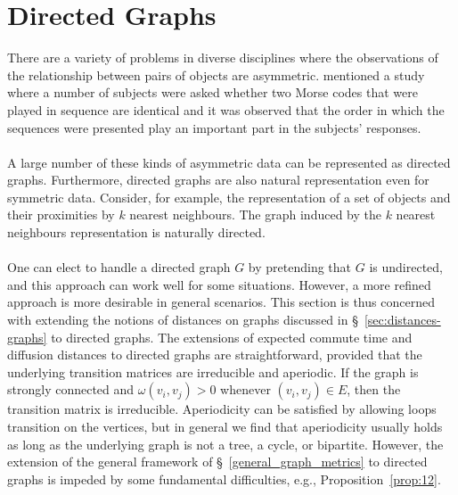 \documentclass[10pt,twocolumn]{article}
\numberwithin{equation}{section}
\begin{document}
\section{Directed Graphs}
\label{sec:dist-direct-graphs}
There are a variety of problems in diverse disciplines where the
observations of the relationship between pairs of objects are
asymmetric. \cite{rothkopf57} mentioned a study where a number of
subjects were asked whether two Morse codes that were played in
sequence are identical and it was observed that the order in which the
sequences were presented play an important part in the subjects'
responses. \\ \\
\noindent
A large number of these kinds of asymmetric data can be represented as
directed graphs. Furthermore, directed graphs are also natural
representation even for symmetric data. Consider, for example, the
representation of a set of objects and their proximities by $k$
nearest neighbours. The graph induced by the $k$ nearest neighbours
representation is naturally directed. \\ \\
%
\noindent
One can elect to handle a directed graph $G$ by pretending that $G$ is
undirected, and this approach can work well for some situations.
However, a more refined approach is more desirable in general
scenarios.  This section is thus concerned with extending the notions
of distances on graphs discussed in \S~\ref{sec:distances-graphs} to
directed graphs. The extensions of expected commute time and diffusion
distances to directed graphs are straightforward, provided that the
underlying transition matrices are irreducible and aperiodic.  If the
graph is strongly connected and $\omega(v_i,v_j) > 0$ whenever
$(v_i,v_j) \in E$, then the transition matrix is irreducible.
Aperiodicity can be satisfied by allowing loops transition on the
vertices, but in general we find that aperiodicity usually holds as
long as the underlying graph is not a tree, a cycle, or bipartite.
However, the extension of the general framework of
\S~\ref{general_graph_metrics} to directed graphs is impeded by some
fundamental difficulties, e.g., Proposition~\ref{prop:12}.
\end{document}
